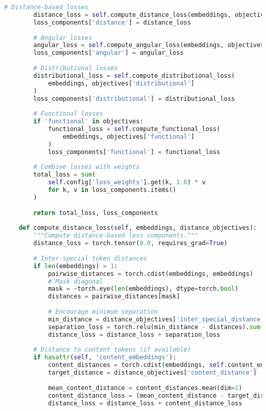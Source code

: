 \begin{lstlisting}[language=Python, caption=Geometric embedding optimization framework]
        # Distance-based losses
        distance_loss = self.compute_distance_loss(embeddings, objectives['distance'])
        loss_components['distance'] = distance_loss
        
        # Angular losses
        angular_loss = self.compute_angular_loss(embeddings, objectives['angular'])
        loss_components['angular'] = angular_loss
        
        # Distributional losses
        distributional_loss = self.compute_distributional_loss(
            embeddings, objectives['distributional']
        )
        loss_components['distributional'] = distributional_loss
        
        # Functional losses
        if 'functional' in objectives:
            functional_loss = self.compute_functional_loss(
                embeddings, objectives['functional']
            )
            loss_components['functional'] = functional_loss
        
        # Combine losses with weights
        total_loss = sum(
            self.config['loss_weights'].get(k, 1.0) * v 
            for k, v in loss_components.items()
        )
        
        return total_loss, loss_components
    
    def compute_distance_loss(self, embeddings, distance_objectives):
        """Compute distance-based loss components."""
        distance_loss = torch.tensor(0.0, requires_grad=True)
        
        # Inter-special token distances
        if len(embeddings) > 1:
            pairwise_distances = torch.cdist(embeddings, embeddings)
            # Mask diagonal
            mask = ~torch.eye(len(embeddings), dtype=torch.bool)
            distances = pairwise_distances[mask]
            
            # Encourage minimum separation
            min_distance = distance_objectives['inter_special_distance']
            separation_loss = torch.relu(min_distance - distances).sum()
            distance_loss = distance_loss + separation_loss
        
        # Distance to content tokens (if available)
        if hasattr(self, 'content_embeddings'):
            content_distances = torch.cdist(embeddings, self.content_embeddings)
            target_distance = distance_objectives['content_distance']
            
            mean_content_distance = content_distances.mean(dim=1)
            content_distance_loss = (mean_content_distance - target_distance).pow(2).sum()
            distance_loss = distance_loss + content_distance_loss
        

\end{lstlisting}
